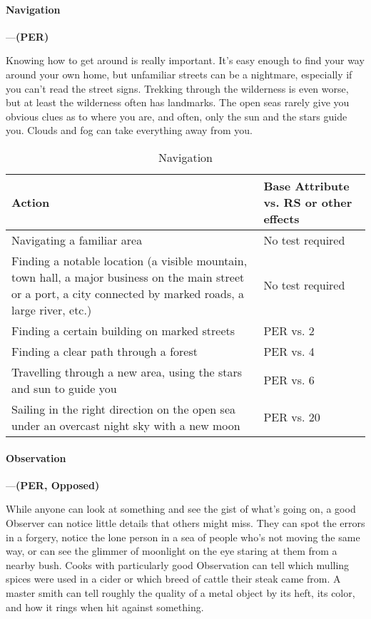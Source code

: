 \documentclass[oneside,11pt,english]{book}
\begin{document}
\paragraph{\label{skill:Navigation}Navigation}---\quad\textbf{(PER) }\par
Knowing how to get around is really important. It’s easy enough to find your way around your own home, but unfamiliar streets can be a nightmare, especially if you can’t read the street signs. Trekking through the wilderness is even worse, but at least the wilderness often has landmarks. The open seas rarely give you obvious clues as to where you are, and often, only the sun and the stars guide you. Clouds and fog can take everything away from you.


\begin{longtabu} to \linewidth{X[1.5]X[r]}
	\caption{Navigation}
	\label{tab:Navigation}\\
	\rowfont[c]{}Action &Base Attribute vs. RS or other effects\\\toprule
Navigating a familiar area&No test required\\
Finding a notable location (a visible mountain, town hall, a major business on the main street or a port, a city connected by marked roads, a large river, etc.)&No test required\\
Finding a certain building on marked streets &PER vs. 2\\
Finding a clear path through a forest &PER vs. 4 \\
Travelling through a new area, using the stars and sun to guide you &PER vs. 6 \\
Sailing in the right direction on the open sea under an overcast night sky with a new moon &PER vs. 20 \\
\end{longtabu}

\paragraph{\label{skill:Observation}Observation}---\quad\textbf{(PER, Opposed) }\par
While anyone can look at something and see the gist of what’s going on, a good Observer can notice little details that others might miss. They can spot the errors in a forgery, notice the lone person in a sea of people who’s not moving the same way, or can see the glimmer of moonlight on the eye staring at them from a nearby bush. Cooks with particularly good Observation can tell which mulling spices were used in a cider or which breed of cattle their steak came from. A master smith can tell roughly the quality of a metal object by its heft, its color, and how it rings when hit against something.
\end{document}
